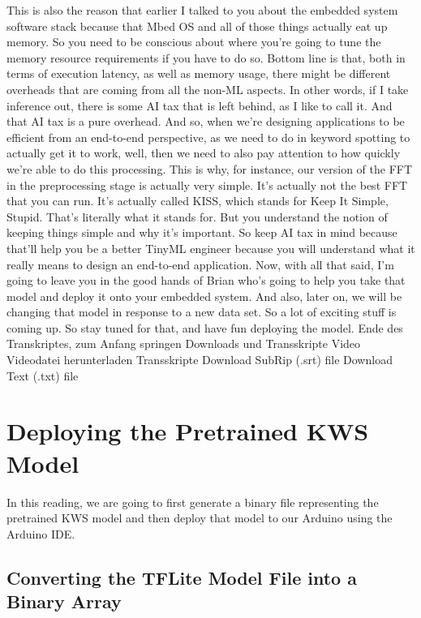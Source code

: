      This is also the reason that earlier I talked to you about the embedded system
     software stack because that Mbed OS and all of those things
     actually eat up memory.
     So you need to be conscious about where you're
     going to tune the memory resource requirements if you have to do so.
     Bottom line is that, both in terms of execution latency,
     as well as memory usage, there might be different overheads that
     are coming from all the non-ML aspects.
     In other words, if I take inference out, there
     is some AI tax that is left behind, as I like to call it.
     And that AI tax is a pure overhead.
     And so, when we're designing applications
     to be efficient from an end-to-end perspective,
     as we need to do in keyword spotting to actually get it to work,
     well, then we need to also pay attention to how quickly we're
     able to do this processing.
     This is why, for instance, our version of the FFT in the preprocessing stage
     is actually very simple.
     It's actually not the best FFT that you can run.
     It's actually called KISS, which stands for Keep It Simple, Stupid.
     That's literally what it stands for.
     But you understand the notion of keeping things simple and why it's important.
     So keep AI tax in mind because that'll help you be a better TinyML
     engineer because you will understand what it really means
     to design an end-to-end application.
     Now, with all that said, I'm going to leave you
     in the good hands of Brian who's going to help you take that model
     and deploy it onto your embedded system.
     And also, later on, we will be changing that model in response
     to a new data set.
     So a lot of exciting stuff is coming up.
     So stay tuned for that, and have fun deploying the model.
     Ende des Transkriptes, zum Anfang springen
     Downloads und Transskripte
     Video
     Videodatei herunterladen
     Transskripte
     Download SubRip (.srt) file
     Download Text (.txt) file   
     
\section{Deploying the Pretrained KWS Model}

    In this reading, we are going to first generate a binary file representing the pretrained KWS model and then deploy that model to our Arduino using the Arduino IDE.
    
\subsection{Converting the TFLite Model File into a Binary Array}

